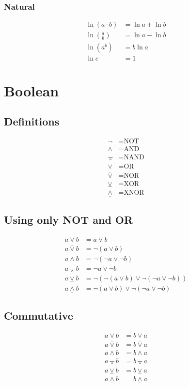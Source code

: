 \documentclass{report}
\DeclareRobustCommand{\lnor}{
    \mathbin{\overline{\vee}}
}
\DeclareRobustCommand{\lxnor}{
    \mathbin{\underline{\wedge}}
}
\def\lnand{\barwedge}
\def\lxor{\veebar}
\theoremstyle{mytheoremstyle}
\theoremstyle{mytheoremstyle}
\theoremstyle{myproblemstyle}
\begin{document}
    \subsubsection{Natural}
    \begin{align}
        \ln\left( a \cdot b \right) &= \ln a + \ln b \\
        \ln\left( \frac{a}{b} \right) &= \ln a - \ln b \\
        \ln\left( a^b \right) &= b\ln a \\
        \ln e &= 1
    \end{align}

    \section{Boolean}
    \subsection{Definitions}
    \begin{align*}
        \lnot  &= \text{NOT}  \\
        \land  &= \text{AND}  \\
        \lnand &= \text{NAND} \\
        \lor   &= \text{OR}   \\
        \lnor  &= \text{NOR}  \\
        \lxor  &= \text{XOR}  \\
        \lxnor &= \text{XNOR}
    \end{align*}
    \subsection{Using only NOT and OR}
    \begin{align}
        a \lor b &= a \lor b \\
        a \lnor b &= \lnot(a \lor b) \\
        a \land b &= \lnot(\lnot a \lor \lnot b) \\
        a \lnand b &= \lnot a \lor \lnot b \\
        a \lxor b &= \lnot(\lnot (a \lor b) \lor \lnot(\lnot a \lor \lnot b)) \\
        a \lxnor b &= \lnot(a \lor b) \lor \lnot (\lnot a \lor \lnot b)
    \end{align}
    \subsection{Commutative}
    \begin{align}
        a \lor b &= b \lor a \\
        a \lnor b &= b \lnor a \\
        a \land b &= b \land a \\
        a \lnand b &= b \lnand a \\
        a \lxor b &= b \lxor a \\
        a \lxnor b &= b \lxnor a \\
    \end{align}
\end{document}
